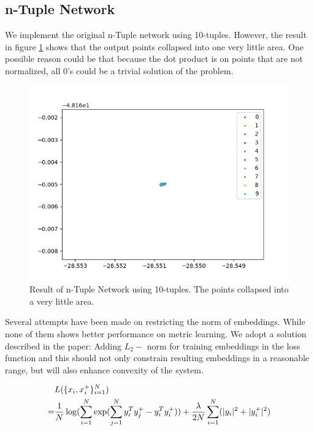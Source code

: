 \documentclass[10pt,twocolumn,letterpaper]{article}
\begin{document}
		\subsection{n-Tuple Network}
			We implement the original n-Tuple network using 10-tuples. However, the result in figure \ref{fig:fail_tuple} shows that the output points collapsed into one very little area.
			One possible reason could be that because the dot product is on points that are not normalized, all 0's could be a trivial solution of the problem.
			
				\begin{figure}[htbp]
					\begin{center}
						\includegraphics[width=0.9\linewidth]{fail_tuple}
					\end{center}
					\caption{Result of n-Tuple Network using 10-tuples. The points collapsed into a very little area.\label{fig:fail_tuple}}
				\end{figure}
			
			Several attempts have been made on restricting the norm of embeddings. While none of them shows better performance on metric learning. We adopt a solution described in the paper: Adding $L_2-$ norm for training embeddings in the loss function and this should not only constrain resulting embeddings in a reasonable range, but will also enhance convexity of the system.
			
			\begin{align}
			&L(\{x_i,x_i^+\}^N_{i=1})\notag\\
			=&\frac{1}{N}\log(\sum_{i=1}^N\exp(\sum_{j=1}^Ny^T_iy_j^+-y_i^Ty_i^+))+ \frac{\lambda}{2N} \sum_{i=1}^N(\lvert y_i\rvert^2+ \lvert y^+_i\rvert^2)
			\end{align}
			
\end{document}
